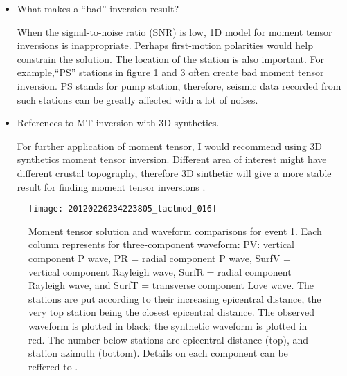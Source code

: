 \documentclass[11pt,titlepage,fleqn]{article}
\begin{document}
\begin{itemize}
\item What makes a ``bad'' inversion result? 

When the signal-to-noise ratio (SNR) is low, 1D model for moment tensor inversions is inappropriate. Perhaps first-motion polarities would help constrain the solution. The location of the station is also important. For example,``PS'' stations in figure 1 and 3 often create bad moment tensor inversion. PS stands for pump station, therefore, seismic data recorded from such stations can be greatly affected with a lot of noises.  

\item References to MT inversion with 3D synthetics.

For further application of moment tensor, I would recommend using 3D synthetics moment tensor inversion. Different area of interest might have  different crustal topography, therefore 3D sinthetic will give a more stable result for finding moment tensor inversions \citep{QLiu2004,ELee2011,CovelloneSavage2012}.
\end{itemize}










\begin{spacing}{1.0}


\end{spacing}


\clearpage\pagebreak



\begin{figure}
\centering
\texttt{[image: 20120226234223805\_tactmod\_016]}
\caption[Moment tensor solution for event 1 (shallow event)]
{{
Moment tensor solution and waveform comparisons for event 1. Each column represents for three-component waveform: PV: vertical component P wave, PR = radial component P wave, SurfV = vertical component Rayleigh wave, SurfR = radial component Rayleigh wave, and SurfT = transverse component Love wave. The stations are put according to their increasing epicentral distance, the very top station being the closest epicentral distance. The observed waveform is plotted in black; the synthetic waveform is plotted in red. The number below stations are epicentral distance (top), and station azimuth (bottom). Details on each component can be reffered to \citet{SilwalTape2016}.
\label{fig:20120226234223805}
}}
\end{figure} 
\end{document}
